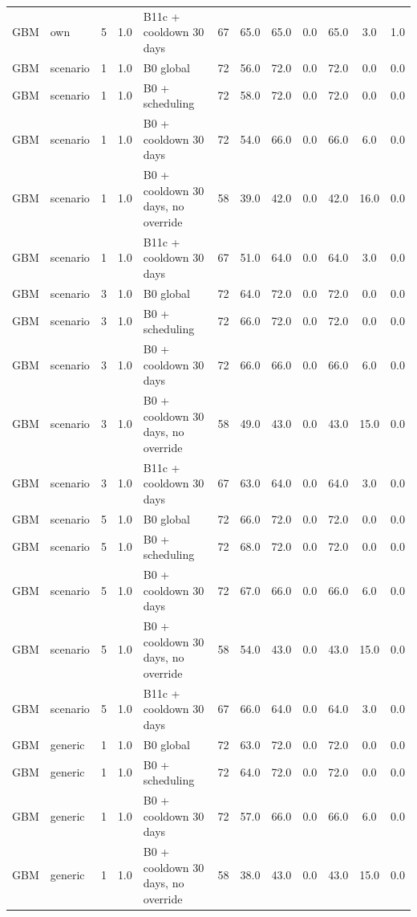 \begin{longtable}{lllllccccccc}
GBM & own & 5 & 1.0 & B11c + cooldown 30 days & 67 & 65.0 & 65.0 & 0.0 & 65.0 & 3.0 & 1.0 \\
GBM & scenario & 1 & 1.0 & B0 global & 72 & 56.0 & 72.0 & 0.0 & 72.0 & 0.0 & 0.0 \\
GBM & scenario & 1 & 1.0 & B0 + scheduling & 72 & 58.0 & 72.0 & 0.0 & 72.0 & 0.0 & 0.0 \\
GBM & scenario & 1 & 1.0 & B0 + cooldown 30 days & 72 & 54.0 & 66.0 & 0.0 & 66.0 & 6.0 & 0.0 \\
GBM & scenario & 1 & 1.0 & B0 + cooldown 30 days, no override & 58 & 39.0 & 42.0 & 0.0 & 42.0 & 16.0 & 0.0 \\
GBM & scenario & 1 & 1.0 & B11c + cooldown 30 days & 67 & 51.0 & 64.0 & 0.0 & 64.0 & 3.0 & 0.0 \\
GBM & scenario & 3 & 1.0 & B0 global & 72 & 64.0 & 72.0 & 0.0 & 72.0 & 0.0 & 0.0 \\
GBM & scenario & 3 & 1.0 & B0 + scheduling & 72 & 66.0 & 72.0 & 0.0 & 72.0 & 0.0 & 0.0 \\
GBM & scenario & 3 & 1.0 & B0 + cooldown 30 days & 72 & 66.0 & 66.0 & 0.0 & 66.0 & 6.0 & 0.0 \\
GBM & scenario & 3 & 1.0 & B0 + cooldown 30 days, no override & 58 & 49.0 & 43.0 & 0.0 & 43.0 & 15.0 & 0.0 \\
GBM & scenario & 3 & 1.0 & B11c + cooldown 30 days & 67 & 63.0 & 64.0 & 0.0 & 64.0 & 3.0 & 0.0 \\
GBM & scenario & 5 & 1.0 & B0 global & 72 & 66.0 & 72.0 & 0.0 & 72.0 & 0.0 & 0.0 \\
GBM & scenario & 5 & 1.0 & B0 + scheduling & 72 & 68.0 & 72.0 & 0.0 & 72.0 & 0.0 & 0.0 \\
GBM & scenario & 5 & 1.0 & B0 + cooldown 30 days & 72 & 67.0 & 66.0 & 0.0 & 66.0 & 6.0 & 0.0 \\
GBM & scenario & 5 & 1.0 & B0 + cooldown 30 days, no override & 58 & 54.0 & 43.0 & 0.0 & 43.0 & 15.0 & 0.0 \\
GBM & scenario & 5 & 1.0 & B11c + cooldown 30 days & 67 & 66.0 & 64.0 & 0.0 & 64.0 & 3.0 & 0.0 \\
GBM & generic & 1 & 1.0 & B0 global & 72 & 63.0 & 72.0 & 0.0 & 72.0 & 0.0 & 0.0 \\
GBM & generic & 1 & 1.0 & B0 + scheduling & 72 & 64.0 & 72.0 & 0.0 & 72.0 & 0.0 & 0.0 \\
GBM & generic & 1 & 1.0 & B0 + cooldown 30 days & 72 & 57.0 & 66.0 & 0.0 & 66.0 & 6.0 & 0.0 \\
GBM & generic & 1 & 1.0 & B0 + cooldown 30 days, no override & 58 & 38.0 & 43.0 & 0.0 & 43.0 & 15.0 & 0.0 \\

\end{longtable}
